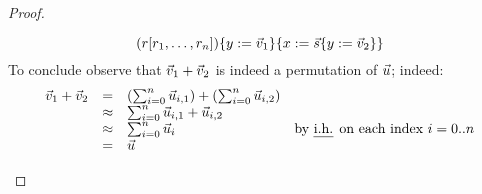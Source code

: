 \begin{proof}
\begin{enumerate}
\[
  (r [r_1, \hdots, r_n])\{y := \vec{v}_1\}\{x := \vec{s}\{y := \vec{v}_2\}\} \\
\]
To conclude observe that $\vec{v}_1 + \vec{v}_2$ is indeed a permutation of $\vec{u}$;
indeed:
\[
  \begin{array}{rcll}
  \ls{\tmthreevariant}_1 + \ls{\tmthreevariant}_2
  & = & (\sum_{i=0}^n \ls{\tmthree}_{i,1}) + (\sum_{i=0}^n \ls{\tmthree}_{i,2}) \\
  & \approx & \sum_{i=0}^n \ls{\tmthree}_{i,1} + \ls{\tmthree}_{i,2} \\
  & \approx & \sum_{i=0}^n \ls{\tmthree}_i & \text{by \ih on each index $i=0..n$} \\
  & = & \ls{\tmthree}
  \end{array}
\]
\end{enumerate}
\end{proof}
